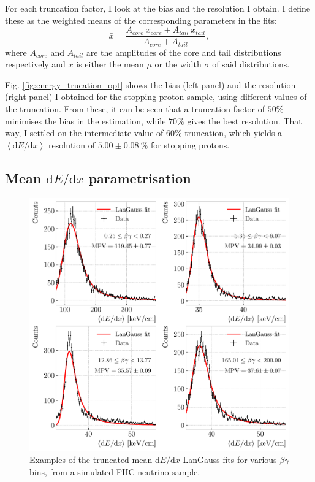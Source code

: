 For each truncation factor, I look at the bias and the resolution I obtain. I define these as the weighted means of the corresponding parameters in the fits:
\begin{equation}
	\bar{x} = \frac{A_{core}~x_{core}+A_{tail}~x_{tail}}{A_{core}+A_{tail}},
\end{equation}
where $A_{core}$ and $A_{tail}$ are the amplitudes of the core and tail distributions respectively and $x$ is either the mean $\mu$ or the width $\sigma$ of said distributions.

Fig. \ref{fig:energy_trucation_opt} shows the bias (left panel) and the resolution (right panel) I obtained for the stopping proton sample, using different values of the truncation. From these, it can be seen that a truncation factor of $50\%$ minimises the bias in the estimation, while $70\%$ gives the best resolution. That way, I settled on the intermediate value of $60\%$ truncation, which yields a $\left<\mathrm{d}E/\mathrm{d}x\right>$ resolution of $5.00\pm0.08~\%$ for stopping protons.

\subsection[Mean \texorpdfstring{$\mathrm{d}E/\mathrm{d}x$}{dE/dx} parametrisation]{Mean \boldmath\texorpdfstring{$\mathrm{d}E/\mathrm{d}x$}{dE/dx} parametrisation}

\begin{figure}[t]
	\centering
	\includegraphics[width=.85\linewidth]{Images/GArSoft_PID/dEdx/dEdx_betagamma_examples.pdf}
	\caption[Examples of the truncated mean $\mathrm{d}E/\mathrm{d}x$ LanGauss fits for various $\beta\gamma$ bins, from a simulated FHC neutrino sample.]{Examples of the truncated mean $\mathrm{d}E/\mathrm{d}x$ LanGauss fits for various $\beta\gamma$ bins, from a simulated FHC neutrino sample.}
	\label{fig:dEdx_betagamma_fits}
\end{figure}

